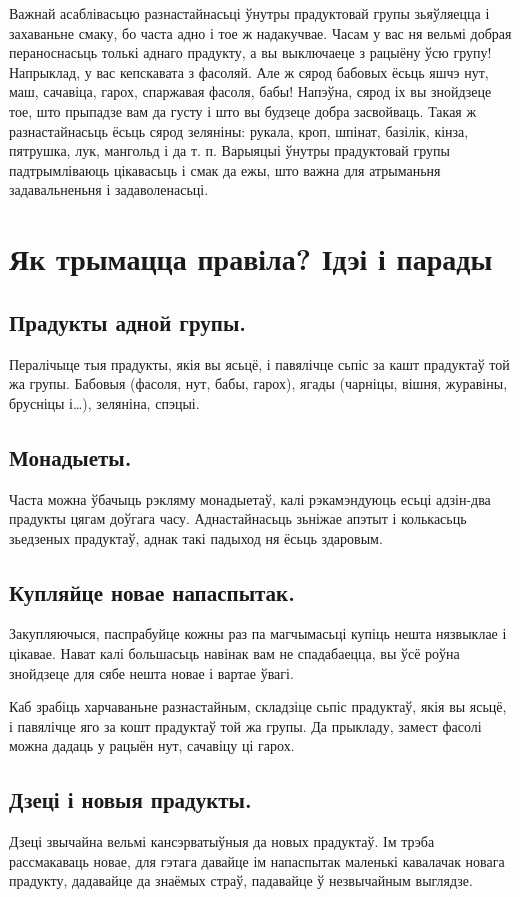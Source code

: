 Важнай асаблівасьцю разнастайнасьці ўнутры прадуктовай групы зьяўляецца і захаваньне смаку, бо часта адно і тое ж надакучвае. Часам у вас ня вельмі добрая пераноснасьць толькі аднаго прадукту, а вы выключаеце з рацыёну ўсю групу! Напрыклад, у вас кепскавата з фасоляй. Але ж сярод бабовых ёсьць яшчэ нут, маш, сачавіца, гарох, спаржавая фасоля, бабы! Напэўна, сярод іх вы знойдзеце тое, што прыпадзе вам да густу і што вы будзеце добра засвойваць. Такая ж разнастайнасьць ёсьць сярод зеляніны: рукала, кроп, шпінат, базілік, кінза, пятрушка, лук, мангольд і да т. п. Варыяцыі ўнутры прадуктовай групы падтрымліваюць цікавасьць і смак да ежы, што важна для атрыманьня задавальненьня і задаволенасьці.

\section{Як трымацца правіла? Ідэі і парады}

\subsection{Прадукты адной групы.}
Пералічыце тыя прадукты, якія вы ясьцё, і павялічце сьпіс за кашт прадуктаў той жа групы. Бабовыя (фасоля, нут, бабы, гарох), ягады (чарніцы, вішня, журавіны, брусніцы і…), зеляніна, спэцыі.

\subsection{Монадыеты.}
Часта можна ўбачыць рэкляму монадыетаў, калі рэкамэндуюць есьці адзін-два прадукты цягам доўгага часу. Аднастайнасьць зьніжае апэтыт і колькасьць зьедзеных прадуктаў, аднак такі падыход ня ёсьць здаровым.

\subsection{Купляйце новае напаспытак.}
Закупляючыся, паспрабуйце кожны раз па магчымасьці купіць нешта нязвыклае і цікавае. Нават калі большасьць навінак вам не спадабаецца, вы ўсё роўна знойдзеце для сябе нешта новае і вартае ўвагі.

Каб зрабіць харчаваньне разнастайным, складзіце сьпіс прадуктаў, якія вы ясьцё, і павялічце яго за кошт прадуктаў той жа групы. Да прыкладу, замест фасолі можна дадаць у рацыён нут, сачавіцу ці гарох.

\subsection{Дзеці і новыя прадукты.}
Дзеці звычайна вельмі кансэрватыўныя да новых прадуктаў. Ім трэба рассмакаваць новае, для гэтага давайце ім напаспытак маленькі кавалачак новага прадукту, дадавайце да знаёмых страў, падавайце ў незвычайным выглядзе.

